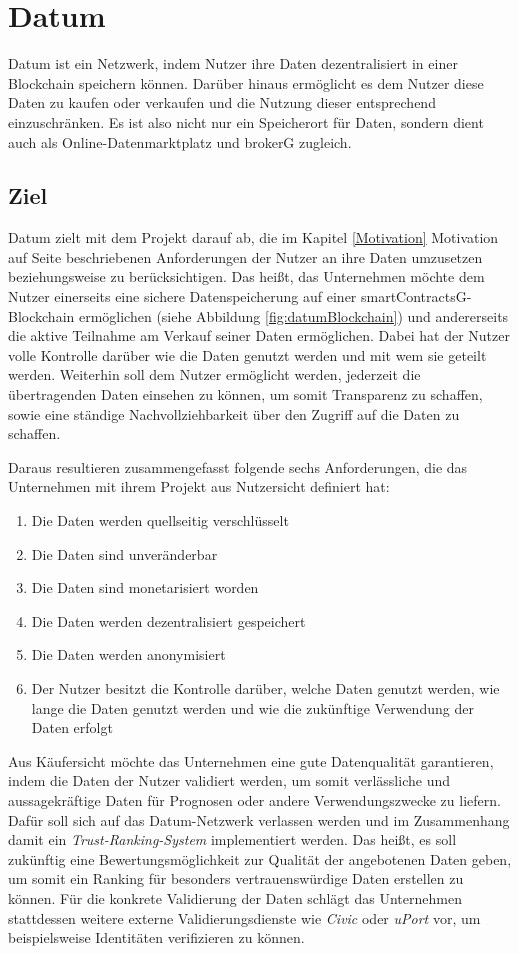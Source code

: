 \section{Datum}
Datum ist ein Netzwerk, indem Nutzer ihre Daten dezentralisiert in einer Blockchain speichern können. Darüber hinaus ermöglicht es dem Nutzer diese Daten zu kaufen oder verkaufen und die Nutzung dieser entsprechend einzuschränken. Es ist also nicht nur ein Speicherort für Daten, sondern dient auch als Online-Datenmarktplatz und \gls{brokerG} zugleich.

\subsection{Ziel}
Datum zielt mit dem Projekt darauf ab, die im Kapitel \ref{Motivation} Motivation auf Seite \pageref{Motivation} beschriebenen Anforderungen der Nutzer an ihre Daten umzusetzen beziehungsweise zu berücksichtigen. Das heißt, das Unternehmen möchte dem Nutzer einerseits eine sichere Datenspeicherung auf einer \gls{smartContractsG}-Blockchain ermöglichen (siehe Abbildung \ref{fig:datumBlockchain}) und andererseits die aktive Teilnahme am Verkauf seiner Daten ermöglichen. Dabei hat der Nutzer volle Kontrolle darüber wie die Daten genutzt werden und mit wem sie geteilt werden. Weiterhin soll dem Nutzer ermöglicht werden, jederzeit die übertragenden Daten einsehen zu können, um somit Transparenz zu schaffen, sowie eine ständige Nachvollziehbarkeit über den Zugriff auf die Daten zu schaffen. \newline

\noindent Daraus resultieren zusammengefasst folgende sechs Anforderungen, die das Unternehmen mit ihrem Projekt aus Nutzersicht definiert hat:
\begin{enumerate}
	\item Die Daten werden quellseitig verschlüsselt
	\item Die Daten sind unveränderbar
	\item Die Daten sind monetarisiert worden
	\item Die Daten werden dezentralisiert gespeichert
	\item Die Daten werden anonymisiert
	\item Der Nutzer besitzt die Kontrolle darüber, welche Daten genutzt werden, wie lange die Daten genutzt werden und wie die zukünftige Verwendung der Daten erfolgt 
\end{enumerate}

\noindent Aus Käufersicht möchte das Unternehmen eine gute Datenqualität garantieren, indem die Daten der Nutzer validiert werden, um somit verlässliche und aussagekräftige Daten für Prognosen oder andere Verwendungszwecke zu liefern. Dafür soll sich auf das Datum-Netzwerk verlassen werden und im Zusammenhang damit ein \textit{Trust-Ranking-System} implementiert werden. Das heißt, es soll zukünftig eine Bewertungsmöglichkeit zur Qualität der angebotenen Daten geben, um somit ein Ranking für besonders vertrauenswürdige Daten erstellen zu können. Für die konkrete Validierung der Daten schlägt das Unternehmen stattdessen weitere externe Validierungsdienste wie \textit{Civic} oder \textit{uPort} vor, um beispielsweise Identitäten verifizieren zu können.

